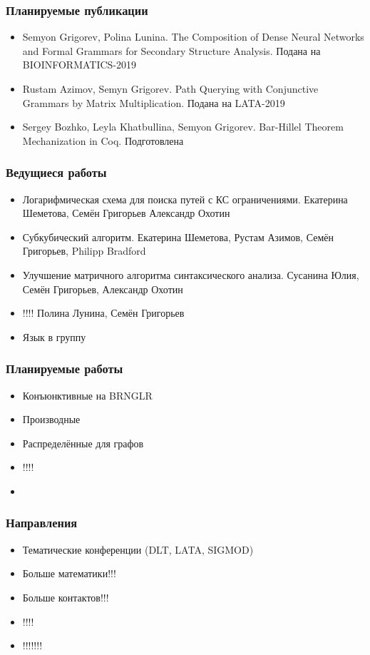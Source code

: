 \documentclass[xcolor=table]{beamer}
\begin{document}
\begin{frame}[fragile]
  \transwipe[direction=90]
  \frametitle{Планируемые публикации}
\begin{itemize}
      \item Semyon Grigorev, Polina Lunina. The Composition of Dense Neural Networks and Formal Grammars for Secondary Structure Analysis. Подана на BIOINFORMATICS-2019
      \item Rustam Azimov, Semyn Grigorev. Path Querying with Conjunctive Grammars by Matrix Multiplication. Подана на LATA-2019
      \item Sergey Bozhko, Leyla Khatbullina, Semyon Grigorev. Bar-Hillel Theorem Mechanization in Coq. Подготовлена
\end{itemize}
\end{frame}

\begin{frame}[fragile]
  \transwipe[direction=90]
  \frametitle{Ведущиеся работы}
\begin{itemize}
      \item Логарифмическая схема для поиска путей с КС ограничениями. Екатерина Шеметова, Семён Григорьев Александр Охотин
      \item Субкубический алгоритм. Екатерина Шеметова, Рустам Азимов, Семён Григорьев, Philipp Bradford
      \item Улучшение матричного алгоритма синтаксического анализа. Сусанина Юлия, Семён Григорьев, Александр Охотин
      \item !!!! Полина Лунина, Семён Григорьев
      \item Язык в группу
\end{itemize}
\end{frame}


\begin{frame}[fragile]
  \transwipe[direction=90]
  \frametitle{Планируемые работы}
\begin{itemize}
      \item Конъюнктивные на BRNGLR
      \item Производные
      \item Распределённые для графов
      \item !!!!
      \item 
\end{itemize}
\end{frame}

\begin{frame}[fragile]
  \transwipe[direction=90]
  \frametitle{Направления}
\begin{itemize}
      \item Тематические конференции (DLT, LATA, SIGMOD)
      \item Больше математики!!!
      \item Больше контактов!!!
      \item !!!!
      \item !!!!!!!
\end{itemize}
\end{frame}
\end{document}
